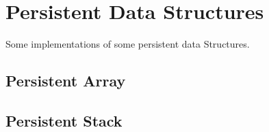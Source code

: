 \section{Persistent Data Structures}
Some implementations of some persistent data Structures.

\subsection{Persistent Array}

\subsection{Persistent Stack}
